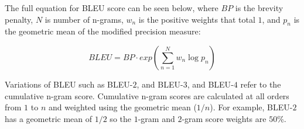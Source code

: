 
The full equation for BLEU score can be seen below, where $BP$ is the brevity penalty, $N$ is number of n-grams, $w_n$ is the positive weights that total $1$, and $p_n$ is the geometric mean of the modified precision measure:

\begin{equation}
    BLEU = BP \cdot exp\left (  \sum_{n=1}^{N} w_{n} \log  p_{n}\right )
\end{equation}


Variations of BLEU such as \acrshort{BLEU}-$2$, and \acrshort{BLEU}-$3$, and \acrshort{BLEU}-$4$ refer to the cumulative n-gram score. Cumulative n-gram scores are calculated at all orders from $1$ to $n$ and weighted using the geometric mean ($1/n$). For example, \acrshort{BLEU}-$2$ has a geometric mean of $1/2$ so the $1$-gram and $2$-gram score weights are $50$\%.















